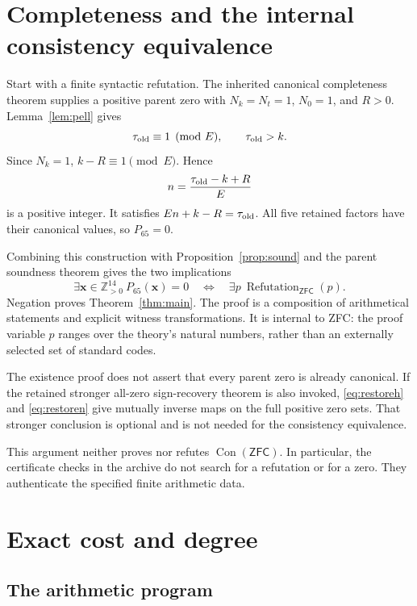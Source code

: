 \documentclass[11pt,letterpaper]{article}
\theoremstyle{definition}
\newcommand{\Zp}{\mathbb Z_{>0}}
\newcommand{\ZFC}{\mathsf{ZFC}}
\newcommand{\Con}{\operatorname{Con}}
\begin{document}
\section{Completeness and the internal consistency equivalence}

Start with a finite syntactic refutation. The inherited canonical
completeness theorem supplies a positive parent zero with
\(N_k=N_t=1\), \(N_0=1\), and \(R>0\).
Lemma~\ref{lem:pell} gives
\[
 \tau_{\rm old}\equiv1\pmod E,\qquad \tau_{\rm old}>k.
\]
Since \(N_k=1\), \(k-R\equiv1\pmod E\). Hence
\begin{equation}\label{eq:restoren}
 n=\frac{\tau_{\rm old}-k+R}{E}
\end{equation}
is a positive integer. It satisfies \(En+k-R=\tau_{\rm old}\).
All five retained factors have their canonical values, so \(P_{65}=0\).

Combining this construction with Proposition~\ref{prop:sound} and the
parent soundness theorem gives the two implications
\[
 \exists\mathbf x\in\Zp^{14}\ P_{65}(\mathbf x)=0
 \quad\Longleftrightarrow\quad
 \exists p\ \operatorname{Refutation}_{\ZFC}(p).
\]
Negation proves Theorem~\ref{thm:main}. The proof is a composition of
arithmetical statements and explicit witness transformations. It is
internal to ZFC: the proof variable \(p\) ranges over the theory's natural
numbers, rather than an externally selected set of standard codes.

The existence proof does not assert that every parent zero is already
canonical. If the retained stronger all-zero sign-recovery theorem is
also invoked, \eqref{eq:restoreh} and \eqref{eq:restoren} give mutually
inverse maps on the full positive zero sets. That stronger conclusion
is optional and is not needed for the consistency equivalence.

This argument neither proves nor refutes \(\Con(\ZFC)\). In particular,
the certificate checks in the archive do not search for a refutation or
for a zero. They authenticate the specified finite arithmetic data.

\section{Exact cost and degree}\label{sec:metrics}

\subsection{The arithmetic program}
\end{document}
